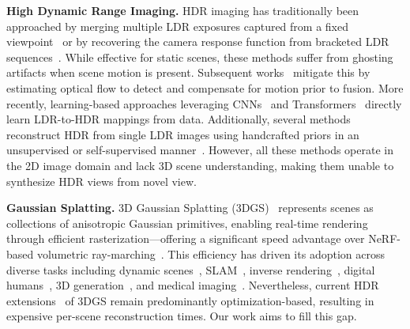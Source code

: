 \documentclass[runningheads]{llncs}
\begin{document}
\noindent\textbf{High Dynamic Range Imaging.} 
HDR imaging has traditionally been approached by merging multiple LDR exposures captured from a fixed viewpoint~\cite{exposure_fusion} or by recovering the camera response function from bracketed LDR sequences~\cite{malik, ward2008high,wu2024fast}.
While effective for static scenes, these methods suffer from ghosting artifacts when scene motion is present.
Subsequent works~\cite{hdr_20,hdr_24,hdr_26,hdr_58,hdr_63} mitigate this by estimating optical flow to detect and compensate for motion prior to fusion.
More recently, learning-based approaches leveraging CNNs~\cite{hdr_cnn_1,hdr_cnn_2,hdr_cnn_3,hdr_cnn_4} and Transformers~\cite{hdr_trans_1,hdr_trans_2,hdr_trans_3,neural_gaffer,magic,promptfix} directly learn LDR-to-HDR mappings from data.
Additionally, several methods reconstruct HDR from single LDR images using handcrafted priors in an unsupervised or self-supervised manner~\cite{SelfHDR,2021labeled,SMAE,nazarczuk2022self,fei2023generative,li2024chaos}.
However, all these methods operate in the 2D image domain and lack 3D scene understanding, making them unable to synthesize HDR views from novel view.

\noindent\textbf{Gaussian Splatting.}
3D Gaussian Splatting (3DGS)~\cite{3dgs} represents scenes as collections of anisotropic Gaussian primitives, enabling real-time rendering through efficient rasterization—offering a significant speed advantage over NeRF-based volumetric ray-marching~\cite{mildenhall2022nerf,jun2022hdr,huang2022hdr}.
This efficiency has driven its adoption across diverse tasks including dynamic scenes~\cite{dynamic3,dynamic1,dynamic2}, SLAM~\cite{slam3,slam4,slam2,slam1}, inverse rendering~\cite{InverseRendering2,InverseRendering3,InverseRendering1}, digital humans~\cite{humangaussian,hugs,gauhuman}, 3D generation~\cite{dreamgaussian,gaussiandreamer,luciddreamer}, and medical imaging~\cite{x_gaussian,r2gs}.
Nevertheless, current HDR extensions~\cite{cai2024hdr,liu2025gausshdr,bolduc2025GaSLight,liu2025mono4dgs,singh24_hdrsplat,gong2025casual3dhdr,li2025sehdr,jin2024lighting,cui2025luminance,zhou2025lita} of 3DGS remain predominantly optimization-based, resulting in expensive per-scene reconstruction times.
Our work aims to fill this gap.
\end{document}
